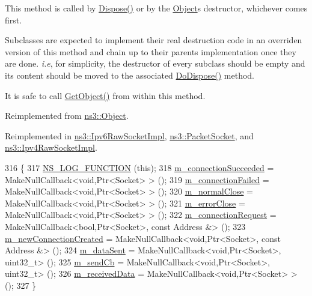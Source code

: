 This method is called by \hyperlink{classns3_1_1Object_aa90ae598863f6c251cdab3c3722afdaf}{Dispose()} or by the \hyperlink{classns3_1_1Object}{Object}\textquotesingle{}s destructor, whichever comes first.

Subclasses are expected to implement their real destruction code in an overriden version of this method and chain up to their parent\textquotesingle{}s implementation once they are done. {\itshape i.\+e}, for simplicity, the destructor of every subclass should be empty and its content should be moved to the associated \hyperlink{classns3_1_1Socket_a5498f836b9b551dd7069562d05382e83}{Do\+Dispose()} method.

It is safe to call \hyperlink{classns3_1_1Object_a13e18c00017096c8381eb651d5bd0783}{Get\+Object()} from within this method. 

Reimplemented from \hyperlink{classns3_1_1Object_a475d429a75d302d4775f4ae32479b287}{ns3\+::\+Object}.



Reimplemented in \hyperlink{classns3_1_1Ipv6RawSocketImpl_a34d6a77e528c452f79a4feb25925b17e}{ns3\+::\+Ipv6\+Raw\+Socket\+Impl}, \hyperlink{classns3_1_1PacketSocket_a1137ff2a8fcc74682b220c059642ee28}{ns3\+::\+Packet\+Socket}, and \hyperlink{classns3_1_1Ipv4RawSocketImpl_a31afca0d33e216abc3077b76880b47e7}{ns3\+::\+Ipv4\+Raw\+Socket\+Impl}.


\begin{DoxyCode}
316 \{
317   \hyperlink{log-macros-disabled_8h_a90b90d5bad1f39cb1b64923ea94c0761}{NS\_LOG\_FUNCTION} (\textcolor{keyword}{this});
318   \hyperlink{classns3_1_1Socket_a77a74e2e90422f1685ca881513045412}{m\_connectionSucceeded} = MakeNullCallback<void,Ptr<Socket> > ();
319   \hyperlink{classns3_1_1Socket_a3994b290c0db400f5e0f4f71b8e8b8dc}{m\_connectionFailed} = MakeNullCallback<void,Ptr<Socket> > ();
320   \hyperlink{classns3_1_1Socket_a097d37abd77901b0b71f9c967f7f4dd8}{m\_normalClose} = MakeNullCallback<void,Ptr<Socket> > ();
321   \hyperlink{classns3_1_1Socket_afc3a4e8c5d4bd0de426197d4874dc8eb}{m\_errorClose} = MakeNullCallback<void,Ptr<Socket> > ();
322   \hyperlink{classns3_1_1Socket_afaf3b168b6508bbfd6812c277fe8adcf}{m\_connectionRequest} = MakeNullCallback<bool,Ptr<Socket>, \textcolor{keyword}{const} Address &> ();
323   \hyperlink{classns3_1_1Socket_acc065ce65a4c63ce212d07987a9beb37}{m\_newConnectionCreated} = MakeNullCallback<void,Ptr<Socket>, \textcolor{keyword}{const} Address &> ();
324   \hyperlink{classns3_1_1Socket_ad55ae6865f79d151176e1014c6ac5b0e}{m\_dataSent} = MakeNullCallback<void,Ptr<Socket>, uint32\_t> ();
325   \hyperlink{classns3_1_1Socket_acafb95acab16c54a933f8e28dabfbadf}{m\_sendCb} = MakeNullCallback<void,Ptr<Socket>, uint32\_t> ();
326   \hyperlink{classns3_1_1Socket_ab04cba5133e96fef09ca9bad8a864243}{m\_receivedData} = MakeNullCallback<void,Ptr<Socket> > ();
327 \}
\end{DoxyCode}


